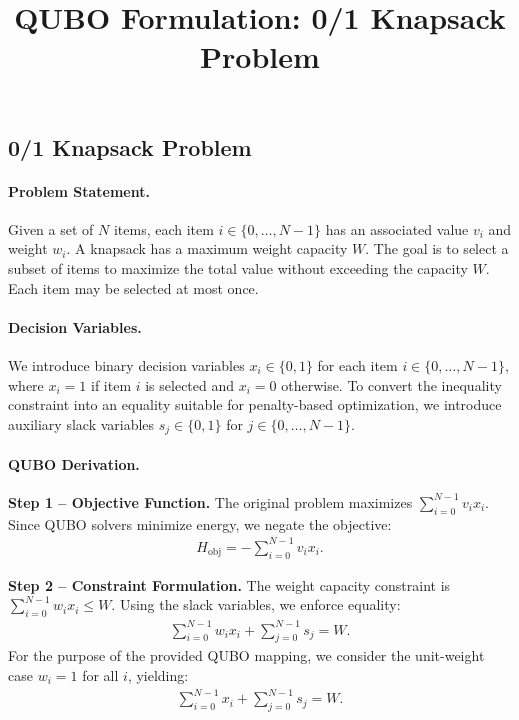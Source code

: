 \documentclass[12pt]{article}
\title{QUBO Formulation: 0/1 Knapsack Problem}
\date{}
\begin{document}
\maketitle

\subsection*{0/1 Knapsack Problem}

\paragraph{Problem Statement.}
Given a set of $N$ items, each item $i \in \{0, \dots, N-1\}$ has an associated value $v_i$ and weight $w_i$. A knapsack has a maximum weight capacity $W$. The goal is to select a subset of items to maximize the total value without exceeding the capacity $W$. Each item may be selected at most once.

\paragraph{Decision Variables.}
We introduce binary decision variables $x_i \in \{0,1\}$ for each item $i \in \{0, \dots, N-1\}$, where $x_i = 1$ if item $i$ is selected and $x_i = 0$ otherwise. To convert the inequality constraint into an equality suitable for penalty-based optimization, we introduce auxiliary slack variables $s_j \in \{0,1\}$ for $j \in \{0, \dots, N-1\}$.

\paragraph{QUBO Derivation.}
\textbf{Step 1 -- Objective Function.} The original problem maximizes $\sum_{i=0}^{N-1} v_i x_i$. Since QUBO solvers minimize energy, we negate the objective:
\begin{align}
H_{\text{obj}} = -\sum_{i=0}^{N-1} v_i x_i.
\end{align}

\textbf{Step 2 -- Constraint Formulation.} The weight capacity constraint is $\sum_{i=0}^{N-1} w_i x_i \le W$. Using the slack variables, we enforce equality:
\begin{align}
\sum_{i=0}^{N-1} w_i x_i + \sum_{j=0}^{N-1} s_j = W.
\end{align}
For the purpose of the provided QUBO mapping, we consider the unit-weight case $w_i = 1$ for all $i$, yielding:
\begin{align}
\sum_{i=0}^{N-1} x_i + \sum_{j=0}^{N-1} s_j = W.
\end{align}
\end{document}
